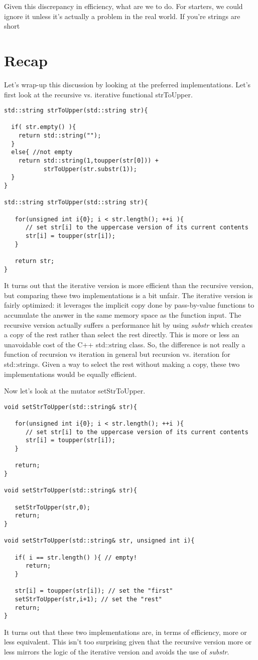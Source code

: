 \documentclass[]{tufte-handout}
\begin{document}
Given this discrepancy in efficiency, what are we to do. For starters, we could ignore it unless it's actually a problem in the real world.  If you're strings are short 

\section{Recap}

Let's wrap-up this discussion by looking at the preferred implementations. Let's first look at the recursive vs. iterative functional strToUpper.
\begin{verbatim}
std::string strToUpper(std::string str){

  if( str.empty() ){
    return std::string("");
  }
  else{ //not empty
    return std::string(1,toupper(str[0])) +
           strToUpper(str.substr(1));
  }  
}

std::string strToUpper(std::string str){
   
   for(unsigned int i{0}; i < str.length(); ++i ){
	  // set str[i] to the uppercase version of its current contents
      str[i] = toupper(str[i]);
   }
   
   return str;
}
\end{verbatim}
It turns out that the iterative version is more efficient than the recursive version, but comparing these two implementations is a bit unfair. The iterative version is fairly optimized: it leverages the implicit copy done by pass-by-value functions to accumulate the answer in the same memory space as the function input. The recursive version actually suffers a performance hit by using \textit{substr} which creates a copy of the rest rather than select the rest directly.  This is more or less an unavoidable cost of the C++ std::string class.  So, the difference is not really a function of recursion vs iteration in general but recursion vs. iteration for std::strings.  Given a way to select the rest without making a copy, these two implementations would be equally efficient.  

Now let's look at the mutator setStrToUpper.
\begin{verbatim}
void setStrToUpper(std::string& str){
   
   for(unsigned int i{0}; i < str.length(); ++i ){
	  // set str[i] to the uppercase version of its current contents
      str[i] = toupper(str[i]);
   }
   
   return;
}

void setStrToUpper(std::string& str){

   setStrToUpper(str,0);
   return;
}

void setStrToUpper(std::string& str, unsigned int i){
   
   if( i == str.length() ){ // empty!
      return;
   }
   
   str[i] = toupper(str[i]); // set the "first"
   setStrToUpper(str,i+1); // set the "rest"
   return;
}
\end{verbatim}
It turns out that these two implementations are, in terms of efficiency, more or less equivalent. This isn't too surprising given that the recursive version more or less mirrors the logic of the iterative version and avoids the use of \textit{substr}. 
\end{document}
